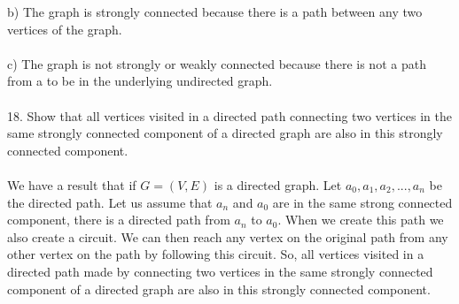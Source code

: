 \documentclass[11pt, oneside]{article}   	%
\begin{document}
b) The graph is strongly connected because there is a path between any two vertices of the graph.\\\\
c) The graph is not strongly or weakly connected because there is not a path from a to be in the underlying undirected graph. \\\\
18. Show that all vertices visited in a directed path connecting two vertices in the same strongly connected component of a directed graph are also in this strongly connected component.\\\\
We have a result that if $G = (V, E)$ is a directed graph. Let $a_0, a_1, a_2,...,a_n$ be the directed path. Let us assume that $a_n$ and $a_0$ are in the same strong connected component, there is a directed path from $a_n$ to $a_0$. When we create this path we also create a circuit. We can then reach any vertex on the original path from any other vertex on the path by following this circuit. So, all vertices visited in a directed path made by connecting two vertices in the same strongly connected component of a directed graph are also in this strongly connected component. 
\end{document}
